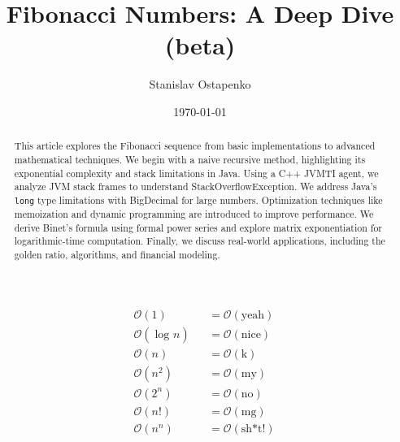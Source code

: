 \documentclass{article}
\begin{document}


\title{Fibonacci Numbers: A Deep Dive (beta)}
\author{Stanislav Ostapenko}
\date{\today}
\maketitle

\begin{abstract}
This article explores the Fibonacci sequence from basic implementations to advanced mathematical techniques. We begin with a naive recursive method, highlighting its exponential complexity and stack limitations in Java. Using a C++ JVMTI agent, we analyze JVM stack frames to understand StackOverflowException. We address Java's \texttt{long} type limitations with BigDecimal for large numbers. Optimization techniques like memoization and dynamic programming are introduced to improve performance. We derive Binet's formula using formal power series and explore matrix exponentiation for logarithmic-time computation. Finally, we discuss real-world applications, including the golden ratio, algorithms, and financial modeling.
\end{abstract}

\clearpage

	\tableofcontents %

	\clearpage
	
	\lstlistoflistings %

\clearpage %

\clearpage

	\thispagestyle{empty}

	\vspace*{\fill}
	\begin{center}
		\Huge
		\begin{align*}
			&   \mathcal{O}(1) &&= \mathcal{O}(\text{yeah})\\
			&    \mathcal{O}(\log_{} n) &&= \mathcal{O}(\text{nice})\\
			&    \mathcal{O}(n) &&= \mathcal{O}(\text{k})\\
			&    \mathcal{O}(n^{2}) &&= \mathcal{O}(\text{my})\\
			&    \mathcal{O}(2^{n}) &&= \mathcal{O}(\text{no})\\
			&    \mathcal{O}(n!) &&= \mathcal{O}(\text{mg})\\
			&    \mathcal{O}(n^{n}) &&= \mathcal{O}(\text{sh*t!})
		\end{align*}
	\end{center}
	\vspace*{\fill}
\end{document}
